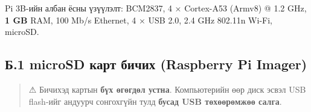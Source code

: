 Pi 3B-ийн албан ёсны үзүүлэлт: BCM2837, 4 × Cortex-A53 (Armv8) @ 1.2 GHz, \textbf{1 GB} RAM, 100 Mb/s Ethernet, 4 × USB 2.0, 2.4 GHz 802.11n Wi-Fi, microSD.

\hypertarget{ux431.1-microsd-ux43aux430ux440ux442-ux431ux438ux447ux438ux445-raspberry-pi-imager}{%
\subsection{Б.1 microSD карт бичих (Raspberry Pi Imager)}\label{ux431.1-microsd-ux43aux430ux440ux442-ux431ux438ux447ux438ux445-raspberry-pi-imager}}

\begin{quote}
⚠ Бичихэд картын \textbf{бүх өгөгдөл устна}. Компьютерийн өөр диск эсвэл USB flash-ийг андуурч сонгохгүйн тулд \textbf{бусад USB төхөөрөмжөө салга}.
\end{quote}

